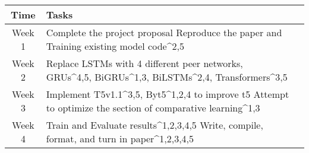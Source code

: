 \documentclass{article}
\begin{document}
\begin{tabular}{c|p{9cm}|p{5cm}}
    \hline
    Time   & \centering Tasks                                                                                                          \\
    \hline
    Week 1 & Complete the project proposal \newline Reproduce the paper and Training existing model code^{2,5}                         \\
    \hline
    Week 2 & Replace LSTMs with 4 different peer networks, GRUs^{4,5}, BiGRUs^{1,3}, BiLSTMs^{2,4}, Transformers^{3,5}                 \\
    \hline
    Week 3 & Implement T5v1.1^{3,5}, Byt5^{1,2,4} to improve t5 \newline Attempt to optimize the section of comparative learning^{1,3} \\
    \hline
    Week 4 & Train and Evaluate results^{1,2,3,4,5} \newline Write, compile, format, and turn in paper^{1,2,3,4,5}                     \\
    \hline
\end{tabular}
\end{document}
